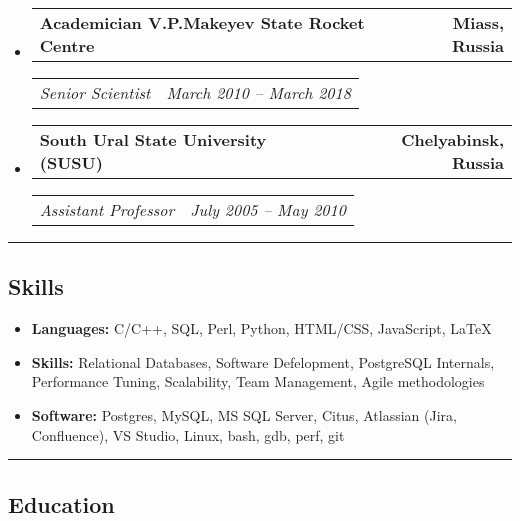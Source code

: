 \documentclass[11pt,letterpaper]{article}
\makeatletter
\newcommand{\headerrow}[2]
{\begin{tabular*}{\linewidth}{l@{\extracolsep{\fill}}r}
#1 &
#2 \\
\end{tabular*}}
\makeatother
\begin{document}
\begin{itemize}[leftmargin=1em]
\begin{itemize*}
	      \end{itemize*}
	\item
	      \headerrow
	      {\textbf{Academician V.P.Makeyev State Rocket Centre}}
	      {\textbf{Miass, Russia}}
	      \headerrow
	      {\emph{Senior Scientist}}
	      {\emph{March 2010 -- March 2018}}
	\item
	      \headerrow
	      {\textbf{South Ural State University (SUSU)}}
	      {\textbf{Chelyabinsk, Russia}}
	      \headerrow
	      {\emph{Assistant Professor}}
	      {\emph{July 2005 -- May 2010}}
\end{itemize}

\hrule
\vspace{-1em}
\subsection*{\Large Skills}

\begin{itemize}[leftmargin=1em,noitemsep]
	\item \textbf{Languages:}
		C/C++, SQL, Perl, Python, HTML/CSS, JavaScript, \LaTeX
	\item \textbf{Skills:}
		Relational Databases, Software Defelopment, PostgreSQL Internals, Performance Tuning, Scalability, Team Management, Agile methodologies
	\item \textbf{Software:}
		Postgres, MySQL, MS SQL Server, Citus, Atlassian (Jira, Confluence), VS Studio, Linux, bash, gdb, perf, git
\end{itemize}

\hrule
\vspace{-1em}
\subsection*{\Large Education}
\end{document}
